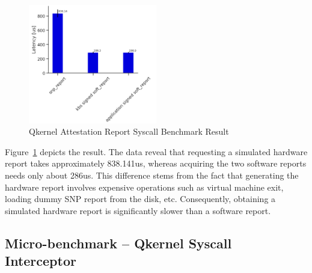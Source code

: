 \begin{figure}[!htb]
    \centering
    \includegraphics[width=0.5\textwidth]{images/perf_attestation_report_result.PNG}
    \caption[Benchmark result of Attestation Report Syscall]{Qkernel Attestation Report Syscall Benchmark Result}
    \label{fig:perf_attestation_report_result}
\end{figure}

Figure~\ref{fig:perf_attestation_report_result}  depicts the result. The data reveal that requesting a simulated hardware report takes approximately 838.141us, whereas acquiring the two software reports needs only about 286us. This difference stems from the fact that generating the hardware report involves expensive operations 
such as virtual machine exit, loading dummy SNP report from the disk, etc. Consequently, obtaining a simulated hardware report is significantly slower than a software report.


\subsection{Micro-benchmark – Qkernel Syscall Interceptor}\label{bench_Interceptor}

